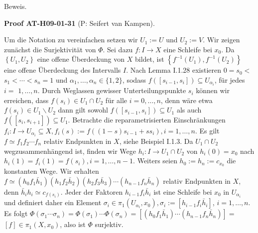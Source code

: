 \documentclass[10pt, letterpaper]{article}
\newcommand{\CustomHeading}[3]{%
  \par\medskip\noindent%
  \textbf{#1 #2} \textnormal{(#3)}.\enskip%
}
\newenvironment{PROOF}[2]{\begin{unitbox}\CustomHeading{Proof}{#1}{#2}}{\end{unitbox}}
\begin{document}
Beweis. 

\begin{PROOF}{AT-H09-01-31}{P: Seifert van Kampen}
Um die Notation zu vereinfachen setzen wir $U_1:=U$ und $U_2:=V$. Wir zeigen zunächst die Surjektivität von $\Phi$. Sei dazu $f: I \rightarrow X$ eine Schleife bei $x_0$. Da $\left\{U_1, U_2\right\}$ eine offene Überdeckung von $X$ bildet, ist $\left\{f^{-1}\left(U_1\right), f^{-1}\left(U_2\right)\right\}$ eine offene Überdeckung des Intervalls $I$. Nach Lemma I.1.28 existieren $0=s_0<$ $s_1<\cdots<s_n=1$ und $\alpha_1, \ldots, \alpha_n \in\{1,2\}$, sodass $f\left(\left[s_{i-1}, s_i\right]\right) \subseteq U_{\alpha_i}$, für jedes $i=$ $1, \ldots, n$. Durch Weglassen gewisser Unterteilungspunkte $s_i$ können wir erreichen, dass $f\left(s_i\right) \in U_1 \cap U_2$ für alle $i=0, \ldots, n$, denn wäre etwa $f\left(s_i\right) \in U_1 \backslash U_2$ dann gilt sowohl $f\left(\left[s_{i-1}, s_i\right]\right) \subseteq U_1$ als auch $f\left(\left[s_i, s_{i+1}\right]\right) \subseteq U_1$. Betrachte die reparametrisierten Einschränkungen $f_i: I \rightarrow U_{\alpha_i} \subseteq X, f_i(s):=f\left((1-s) s_{i-1}+s s_i\right), i=1, \ldots, n$. Es gilt $f \simeq f_1 f_2 \cdots f_n$ relativ Endpunkten in $X$, siehe Beispiel I.1.3. Da $U_1 \cap U_2$ wegzusammenhängend ist, finden wir Wege $h_i: I \rightarrow U_1 \cap U_2$ von $h_i(0)=x_0$ nach $h_i(1)=f_i(1)=f\left(s_i\right), i=1, \ldots, n-1$. Weiters seien $h_0:=h_n:=c_{x_0}$ die konstanten Wege. Wir erhalten $f \simeq\left(h_0 f_1 \bar{h}_1\right)\left(h_1 f_2 \bar{h}_2\right)\left(h_2 f_3 \bar{h}_3\right) \cdots\left(h_{n-1} f_n \bar{h}_n\right)$ relativ Endpunkten in $X$, denn $\bar{h}_i h_i \simeq c_{f\left(s_i\right)}$. Jeder der Faktoren $h_{i-1} f_i \bar{h}_i$ ist eine Schleife bei $x_0$ in $U_{\alpha_i}$ und definiert daher ein Element $\sigma_i \in \pi_1\left(U_{\alpha_i}, x_0\right), \sigma_i:=\left[h_{i-1} f_i \bar{h}_i\right]$, $i=1, \ldots, n$. Es folgt $\Phi\left(\sigma_1 \cdots \sigma_n\right)=\Phi\left(\sigma_1\right) \cdots \Phi\left(\sigma_n\right)=\left[\left(h_0 f_1 \bar{h}_1\right) \cdots\left(h_{n-1} f_n \bar{h}_n\right)\right]=$ $[f] \in \pi_1\left(X, x_0\right)$, also ist $\Phi$ surjektiv.


\end{PROOF}
\end{document}

